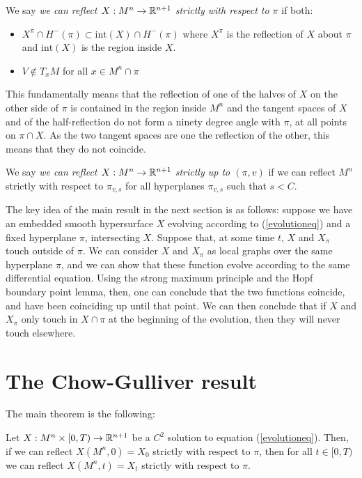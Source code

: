 \begin{defin}
	We say {\em we can reflect $X: M^n\rightarrow \mathbb{R}^{n+1}$ strictly with respect to $\pi$} if both:
	\begin{itemize}
		\item $X^\pi\cap H^-(\pi)\subset \mathrm{int}(X)\cap H^-(\pi)$ where $X^\pi$ is the reflection of $X$ about $\pi$ and $\mathrm{int}(X)$ is the region inside $X$.
		\item $V\notin T_xM$ for all $x\in M^n \cap\pi$
	\end{itemize} 
\end{defin}
This fundamentally means that the reflection of one of the halves of $X$ on the other side of $\pi$ is contained in the region inside $M^n$ and the tangent spaces of $X$ and of the half-reflection do not form a ninety degree angle with $\pi$, at all points on $\pi\cap X$. As the two tangent spaces are one the reflection of the other, this means that they do not coincide.   
\begin{defin}
	We say {\em we can reflect $X: M^n\rightarrow \mathbb{R}^{n+1}$ strictly up to $(\pi,v)$} if we can reflect $M^n$ strictly with respect to $\pi_{v, s}$ for all hyperplanes $\pi_{v, s}$ such that $s<C$.  
\end{defin}

The key idea of the main result in the next section is as follows: suppose we have an embedded smooth hypersurface $X$ evolving according to (\ref{evolutioneq}) and a fixed hyperplane $\pi$, intersecting $X$. Suppose that, at some time $t$, $X$ and  $X_\pi$ touch outside of $\pi$. We can consider $X$ and  $X_\pi$ as local graphs over the same hyperplane $\pi$, and we can show that these function evolve according to the same differential equation. Using the strong maximum principle and the Hopf boundary point lemma, then, one can conclude that the two functions coincide, and have been coinciding up until that point. We can then conclude that if  $X$ and  $X_\pi$ only touch in $X\cap\pi$ at the beginning of the evolution, then they will never touch elsewhere.  


\section{The Chow-Gulliver result}

The main theorem is the following: 

\begin{theorem}\label{chow gulliver}
	Let $X:M^n\times [0,T) \rightarrow \mathbb{R}^{n+1}$ be a $C^2$ solution to equation (\ref{evolutioneq}). Then, if we can reflect $X(M^n, 0)=X_0$ strictly with respect to $\pi$, then for all $t\in [0,T)$ we can reflect $X(M^n, t)=X_t$ strictly with respect to $\pi$. 
\end{theorem}

